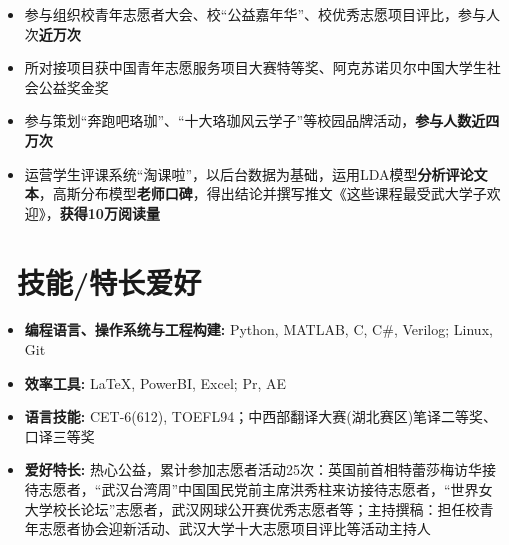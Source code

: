 \documentclass{resume}
\begin{document}
\begin{itemize}
  \item 参与组织校青年志愿者大会、校``公益嘉年华''、校优秀志愿项目评比，参与人次\textbf{近万次}
  \item 所对接项目获中国青年志愿服务项目大赛特等奖、阿克苏诺贝尔中国大学生社会公益奖金奖
\end{itemize}

\begin{itemize}
  \item 参与策划``奔跑吧珞珈''、``十大珞珈风云学子''等校园品牌活动，\textbf{参与人数近四万次}
  \item 运营学生评课系统``淘课啦''，以后台数据为基础，运用LDA模型\textbf{分析评论文本}，高斯分布模型\textbf{老师口碑}，得出结论并撰写推文《这些课程最受武大学子欢迎》，\textbf{获得10万阅读量}
\end{itemize}



\section{\faHeartO\ 技能/特长爱好}
\begin{itemize}
  \item \textbf{编程语言、操作系统与工程构建: }Python, MATLAB, C, C$\#$, Verilog; Linux, Git 
  \item \textbf{效率工具: }LaTeX, PowerBI, Excel; Pr, AE
  \item \textbf{语言技能: }CET-6(612), TOEFL94；中西部翻译大赛(湖北赛区)笔译二等奖、口译三等奖
  \item \textbf{爱好特长: }热心公益，累计参加志愿者活动25次：英国前首相特蕾莎梅访华接待志愿者，``武汉台湾周''中国国民党前主席洪秀柱来访接待志愿者，``世界女大学校长论坛''志愿者，武汉网球公开赛优秀志愿者等；主持撰稿：担任校青年志愿者协会迎新活动、武汉大学十大志愿项目评比等活动主持人
\end{itemize}


%
%
\end{document}
